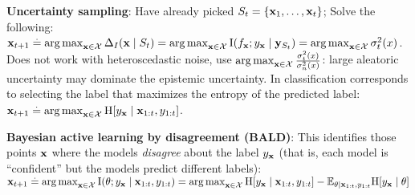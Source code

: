 \textbf{Uncertainty sampling}: Have already picked $S_t = \{\mathbf{x}_1, \dots, \mathbf{x}_t\}$; Solve the following: $\vx_{t+1} \defeq \argmax_{\vx \in \spX} \Delta_I(\vx \mid \sS_t) = \argmax_{\vx \in \spX} \Ism{f_\vx}{y_{\vx} \mid \vy_{\sS_t}}=\argmax_{\vx\in \spX}{\sigma_t^2(x)} $. Does not work with heteroscedastic noise, use \(\operatorname*{arg\,max}_{\mathbf{x}\in \mathcal{X}} \frac{\sigma_t^2(x)}{\sigma_n^2(x)} \): large aleatoric uncertainty may dominate the epistemic uncertainty. In classification corresponds to selecting the label that maximizes the entropy of the predicted label: $\vx_{t+1} \defeq \argmax_{\vx \in \spX} \H{y_{\vx} \mid \vx_{1:t}, y_{1:t}}$. \\
\begin{framed}
    \textbf{Bayesian active learning by disagreement (BALD)}: This identifies those points $\mathbf{x}$ where the models \emph{disagree} about the label $y_{\mathbf{x}}$ (that is, each model is ``confident'' but the models predict different labels): $\vx_{t+1} \defeq \argmax_{\vx \in \spX} \I{\vtheta}{y_{\vx} \mid \vx_{1:t}, y_{1:t}} = \argmax_{\vx \in \spX} \H{y_{\vx} \mid \vx_{1:t}, y_{1:t}} - \E*[\vtheta \mid \vx_{1:t}, y_{1:t}]{\H{y_{\vx} \mid \vtheta}}$ 
\end{framed}
